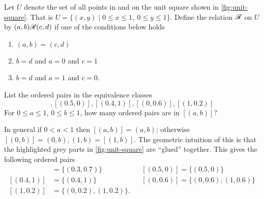 \documentclass[a4paper, english, 12pt]{article} %
\begin{document}
\begin{problem}
  Let $U$ denote the set of all points in and on the unit square shown in
  \cref{fig:unit-square}. That is $U = \{ (x,y) \mid 0 \leq x \leq 1, \ 0 \leq y
  \leq 1\}$. Define the relation $\mathscr{R}$ on $U$ by $(a,b) \mathscr{R} (c,d)$ if one of the
  conditions below holds
  
  \begin{minipage}[c]{0.5\textwidth}
  \begin{enumerate}
    \item $(a,b) = (c,d)$
    \item $b = d$ and $a = 0$ and $c = 1$
    \item $b = d$ and $a = 1$ and $c = 0$.
  \end{enumerate}
  \end{minipage}
  \begin{minipage}[c]{0.5\textwidth}
    \centering
    \label{fig:unit-square}
  \end{minipage}
\end{problem}

\begin{subproblem}[2]
  List the ordered pairs in the equivalence classes
  \begin{equation}
    [(0.3, 0.7)], [(0.5, 0)], [(0.4, 1)], [(0, 0.6)], [(1, 0.2)]
  \end{equation}
  For $0 \leq a \leq 1$, $0 \leq b \leq 1$, how many ordered pairs are in $[(a,b)]$?
\end{subproblem}
  
\begin{answer}
  \noindent
  In general if $0 < a < 1$ then $[(a,b)] = {(a,b)}$; otherwise $[(0,b)] =
  {(0,b), (1, b)} = [(1, b)]$. The geometric intuition of this is that the
  highlighted grey parts in \cref{fig:unit-square} are ``glued'' together. This
  gives the following ordered pairs
  \begin{align*}
    [(0.3, 0.7)] & = \{ (0.3, 0.7)\}
    &&[(0.5, 0)] = \{ (0.5, 0)\} \\
    [(0.4, 1)] &= \{(0.4, 1)\}
    &&[(0, 0.6)] = \{ (0, 0.6), (1, 0.6)\} \\
    [(1,0.2)] &= \{(0, 0.2), (1, 0.2)\}.
  \end{align*}
\end{answer}
\end{document}
